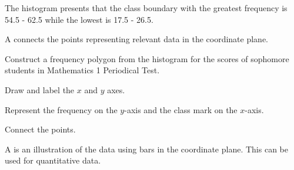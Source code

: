 The histogram presents that the class boundary with the greatest frequency is
54.5 - 62.5 while the lowest is 17.5 - 26.5.
\begin{definition}
A  connects the points representing relevant data in the
coordinate plane.
\end{definition}
\begin{example}
\Item Construct a frequency polygon from the histogram for the scores of
sophomore students in Mathematics 1 Periodical Test.

\Solution

\begin{myenumerate}
\item Draw and label the $x$ and $y$ axes.
\item Represent the frequency on the $y$-axis and the class mark on the $x$-axis.
\item Connect the points.
\begin{center}
\end{center}
\end{myenumerate}
\end{example}
\begin{definition}
A  is an illustration of the data using bars in the coordinate plane.
This can be used for quantitative data. %
\end{definition}
